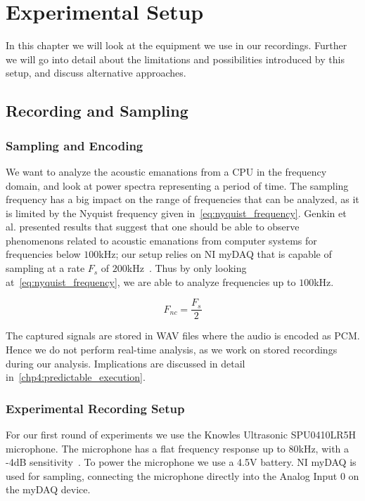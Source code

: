 \chapter{Experimental Setup}
\label{chp:experimental_setup}
In this chapter we will look at the equipment we use in our recordings.
Further we will go into detail about the limitations and possibilities introduced by this setup, and discuss alternative approaches.


\section{Recording and Sampling}\label{chp3:sec:microphone_selection}

\subsection{Sampling and Encoding}
We want to analyze the acoustic emanations from a \gls{CPU} in the frequency domain, and look at power spectra representing a period of time.
The sampling frequency has a big impact on the range of frequencies that can be analyzed, as it is limited by the Nyquist frequency given in~\autoref{eq:nyquist_frequency}.
Genkin et al. presented results that suggest that one should be able to observe phenomenons related to acoustic emanations from computer systems for frequencies below \(100\)kHz; our setup relies on \gls{NI} myDAQ that is capable of sampling at a rate \({F_{s}}\) of \(200\)kHz~\footnotemark.
Thus by only looking at~\autoref{eq:nyquist_frequency}, we are able to analyze frequencies up to \(100\)kHz.



\begin{equation}\label{eq:nyquist_frequency}
F_{nc} = \frac{F_{s}}{2}
\end{equation}

The captured signals are stored in WAV files where the audio is encoded as \gls{PCM}.
Hence we do not perform real-time analysis, as we work on stored recordings during our analysis.
Implications are discussed in detail in~\autoref{chp4:predictable_execution}.


\subsection{Experimental Recording Setup}\label{chp3:sec:knowles_configuration}
For our first round of experiments we use the Knowles Ultrasonic SPU0410LR5H microphone.
The microphone has a flat frequency response up to 80kHz, with a -4dB sensitivity~\cite{url:knowles_spec}.
To power the microphone we use a 4.5V battery.
\gls{NI} myDAQ is used for sampling, connecting the microphone directly into the Analog Input 0 on the myDAQ device.

